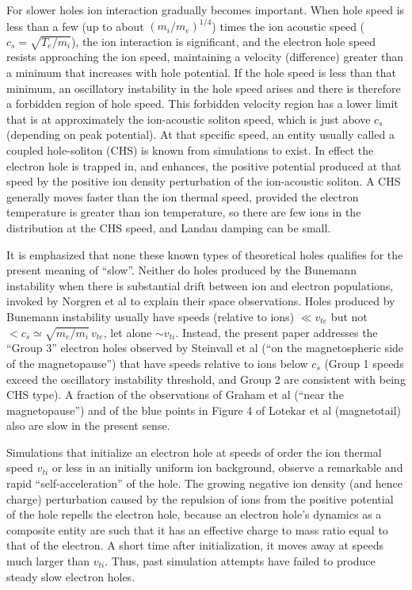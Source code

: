 \documentclass[pre]{revtex4-2}
\begin{document}
For slower holes ion interaction gradually becomes important.  When
hole speed is less than a few (up to about $(m_i/m_e)^{1/4}$) times
the ion acoustic speed ($c_s=\sqrt{T_e/m_i}$), the ion interaction is
significant, and the electron hole speed resists approaching the ion
speed\cite{Hutchinson2016,Zhou2016}, maintaining a velocity
(difference) greater than a minimum that increases with hole
potential. If the hole speed is less than that minimum, an oscillatory
instability in the hole speed arises\cite{Zhou2017} and there is
therefore a forbidden region of hole speed. This forbidden velocity
region has a lower limit that is at approximately the ion-acoustic
soliton speed, which is just above $c_s$ (depending on peak
potential\cite{Davidson1972}). At that specific speed, an entity
usually called a coupled hole-soliton (CHS) is known from
simulations\cite{Saeki1991,Saeki1998,Zhou2018} to exist. In effect the
electron hole is trapped in, and enhances, the positive potential
produced at that speed by the positive ion density perturbation of the
ion-acoustic soliton. A CHS generally moves faster than the ion
thermal speed, provided the electron temperature is greater than ion
temperature, so there are few ions in the distribution at the CHS
speed, and Landau damping can be small.

It is emphasized that none these known types of theoretical holes
qualifies for the present meaning of ``slow''. Neither do holes
produced by the Bunemann instability when there is substantial drift
between ion and electron populations, invoked by Norgren et
al\cite{Norgren2015,Norgren2015a} to explain their space
observations. Holes produced\cite{Drake2003,Khotyaintsev2010,Zhou2018}
by Bunemann instability usually have speeds (relative to ions)
$\ll v_{te}$ but not $<c_s\simeq\sqrt{m_e/m_i}\,v_{te}$, let alone
$\sim v_{ti}$.  Instead, the present paper addresses the ``Group 3''
electron holes observed by Steinvall et al\cite{Steinvall2019} (``on
the magnetospheric side of the magnetopause'') that have speeds
relative to ions below $c_s$ (Group 1 speeds exceed the oscillatory
instability threshold, and Group 2 are consistent with being CHS
type). A fraction of the observations of Graham et al\cite{Graham2016}
(``near the magnetopause'') and of the blue points in Figure 4 of
Lotekar et al\cite{Lotekar2020} (magnetotail) also are slow in the
present sense.


Simulations that initialize an electron hole at speeds of order the
ion thermal speed $v_{ti}$ or less in an initially uniform ion
background, observe a remarkable and rapid ``self-acceleration'' of
the
hole\cite{Saeki1991,Muschietti1999,Eliasson2004,Eliasson2006,Zhou2016}. The
growing negative ion density (and hence charge) perturbation caused by
the repulsion of ions from the positive potential of the hole repells
the electron hole, because an electron hole's dynamics as a composite
entity are such that it has an effective charge to mass ratio equal to
that of the electron\cite{Haakonsen2015,Hutchinson2016}. A short time
after initialization, it moves away at speeds much larger than
$v_{ti}$. Thus, past simulation attempts have failed to produce steady
slow electron holes.
\end{document}
